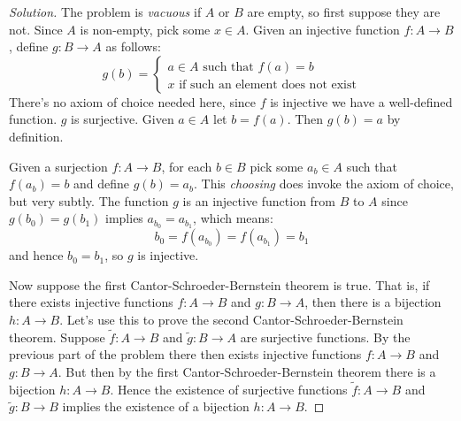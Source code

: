 \documentclass{article}
\theoremstyle{normal}
\begin{document}
    \color{black}
    \begin{proof}[Solution]
        The problem is \textit{vacuous} if $A$ or $B$ are empty, so first
        suppose they are not. Since $A$ is non-empty, pick some $x\in{A}$.
        Given an injective function $f:A\rightarrow{B}$, define
        $g:B\rightarrow{A}$ as follows:
        \begin{equation}
            g(b)=
            \begin{cases}
                a\in{A}\textrm{ such that }f(a)=b\\
                x\textrm{ if such an element does not exist}
            \end{cases}
        \end{equation}
        There's no axiom of choice needed here, since $f$ is injective we have
        a well-defined function. $g$ is surjective. Given $a\in{A}$ let
        $b=f(a)$. Then $g(b)=a$ by definition.
        \par\hfill\par
        Given a surjection $f:A\rightarrow{B}$, for each
        $b\in{B}$ pick some $a_{b}\in{A}$ such that
        $f(a_{b})=b$ and define $g(b)=a_{b}$. This \textit{choosing} does invoke
        the axiom of choice, but very subtly. The function $g$ is an injective
        function from $B$ to $A$ since
        $g(b_{0})=g(b_{1})$ implies $a_{b_{0}}=a_{b_{1}}$, which means:
        \begin{equation}
            b_{0}=f(a_{b_{0}})=f(a_{b_{1}})=b_{1}
        \end{equation}
        and hence $b_{0}=b_{1}$, so $g$ is injective.
        \par\hfill\par
        Now suppose the first Cantor-Schroeder-Bernstein theorem is true.
        That is, if there exists injective functions $f:A\rightarrow{B}$ and
        $g:B\rightarrow{A}$, then there is a bijection $h:A\rightarrow{B}$.
        Let's use this to prove the second Cantor-Schroeder-Bernstein theorem.
        Suppose $\tilde{f}:A\rightarrow{B}$ and $\tilde{g}:B\rightarrow{A}$ are
        surjective functions. By the previous part of the problem there then
        exists injective functions $f:A\rightarrow{B}$ and $g:B\rightarrow{A}$.
        But then by the first Cantor-Schroeder-Bernstein theorem there is a
        bijection $h:A\rightarrow{B}$. Hence the existence of surjective
        functions $\tilde{f}:A\rightarrow{B}$ and $\tilde{g}:B\rightarrow{B}$
        implies the existence of a bijection $h:A\rightarrow{B}$.

\end{proof}
\end{document}
